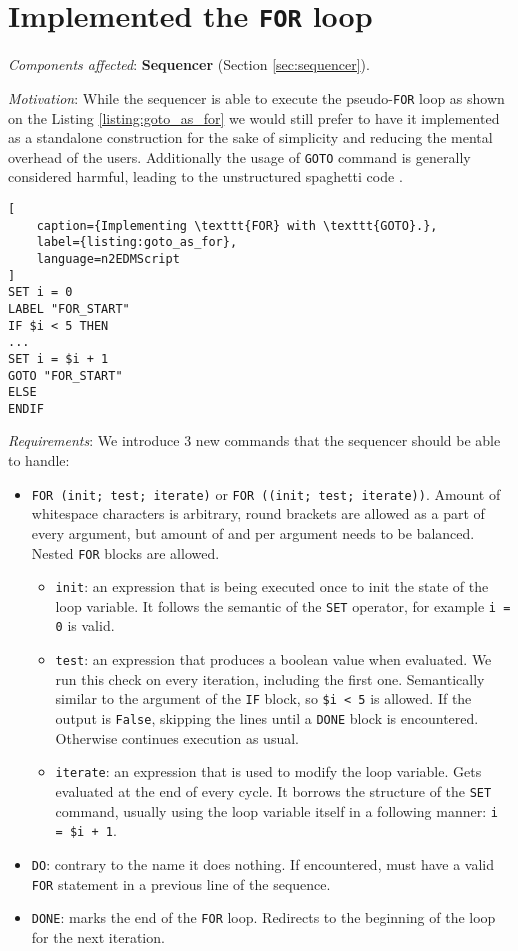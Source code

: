 \section{Implemented the \texttt{FOR} loop}
\label{sec:for_loop}

\textit{Components affected}: \textbf{Sequencer} (Section \ref{sec:sequencer}).

\textit{Motivation}: While the sequencer is able to execute the pseudo-\texttt{FOR} loop as shown on the Listing \ref{listing:goto_as_for} we would still prefer to have it implemented as a standalone construction for the sake of simplicity and reducing the mental overhead of the users. Additionally the usage of \texttt{GOTO} command is generally considered \cite{Dijkstra1968} harmful, leading to the unstructured spaghetti code \cite{Cram2005}.

\begin{lstlisting}[
	caption={Implementing \texttt{FOR} with \texttt{GOTO}.}, 
	label={listing:goto_as_for}, 
	language=n2EDMScript
]
SET i = 0
LABEL "FOR_START"
IF $i < 5 THEN
...
SET i = $i + 1
GOTO "FOR_START"
ELSE
ENDIF
\end{lstlisting}

\textit{Requirements}: We introduce 3 new commands that the sequencer should be able to handle:

\begin{itemize}
	\item \texttt{FOR (init; test; iterate)} or \texttt{FOR ((init; test; iterate))}. Amount of whitespace characters is arbitrary, round brackets are allowed as a part of every argument, but amount of \highlight{(} and \highlight{)} per argument needs to be balanced. Nested \texttt{FOR} blocks are allowed.
	\begin{itemize}
		\item \texttt{init}: an expression that is being executed once to init the state of the loop variable. It follows the semantic of the \texttt{SET} operator, for example \texttt{i = 0} is valid.
		\item \texttt{test}: an expression that produces a boolean value when evaluated. We run this check on every iteration, including the first one. Semantically similar to the argument of the \texttt{IF} block, so \texttt{\$i < 5} is allowed. If the output is \texttt{False}, skipping the lines until a \texttt{DONE} block is encountered. Otherwise continues execution as usual.
		\item \texttt{iterate}: an expression that is used to modify the loop variable. Gets evaluated at the end of every cycle. It borrows the structure of the \texttt{SET} command, usually using the loop variable itself in a following manner: \texttt{i = \$i + 1}.
	\end{itemize}
	\item \texttt{DO}: contrary to the name it does nothing. If encountered, must have a valid \texttt{FOR} statement in a previous line of the sequence.
	\item \texttt{DONE}: marks the end of the \texttt{FOR} loop. Redirects to the beginning of the loop for the next iteration.
\end{itemize}

